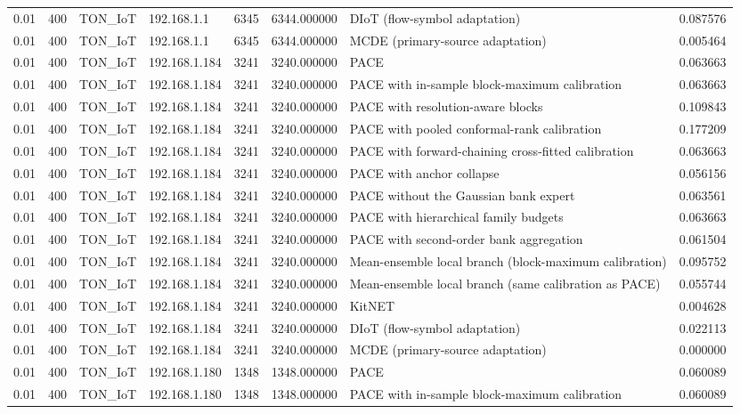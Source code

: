 \begin{tabular}{llllllll}
0.01 & 400 & TON\_IoT & 192.168.1.1 & 6345 & 6344.000000 & DIoT (flow-symbol adaptation) & 0.087576 \\
0.01 & 400 & TON\_IoT & 192.168.1.1 & 6345 & 6344.000000 & MCDE (primary-source adaptation) & 0.005464 \\
0.01 & 400 & TON\_IoT & 192.168.1.184 & 3241 & 3240.000000 & PACE & 0.063663 \\
0.01 & 400 & TON\_IoT & 192.168.1.184 & 3241 & 3240.000000 & PACE with in-sample block-maximum calibration & 0.063663 \\
0.01 & 400 & TON\_IoT & 192.168.1.184 & 3241 & 3240.000000 & PACE with resolution-aware blocks & 0.109843 \\
0.01 & 400 & TON\_IoT & 192.168.1.184 & 3241 & 3240.000000 & PACE with pooled conformal-rank calibration & 0.177209 \\
0.01 & 400 & TON\_IoT & 192.168.1.184 & 3241 & 3240.000000 & PACE with forward-chaining cross-fitted calibration & 0.063663 \\
0.01 & 400 & TON\_IoT & 192.168.1.184 & 3241 & 3240.000000 & PACE with anchor collapse & 0.056156 \\
0.01 & 400 & TON\_IoT & 192.168.1.184 & 3241 & 3240.000000 & PACE without the Gaussian bank expert & 0.063561 \\
0.01 & 400 & TON\_IoT & 192.168.1.184 & 3241 & 3240.000000 & PACE with hierarchical family budgets & 0.063663 \\
0.01 & 400 & TON\_IoT & 192.168.1.184 & 3241 & 3240.000000 & PACE with second-order bank aggregation & 0.061504 \\
0.01 & 400 & TON\_IoT & 192.168.1.184 & 3241 & 3240.000000 & Mean-ensemble local branch (block-maximum calibration) & 0.095752 \\
0.01 & 400 & TON\_IoT & 192.168.1.184 & 3241 & 3240.000000 & Mean-ensemble local branch (same calibration as PACE) & 0.055744 \\
0.01 & 400 & TON\_IoT & 192.168.1.184 & 3241 & 3240.000000 & KitNET & 0.004628 \\
0.01 & 400 & TON\_IoT & 192.168.1.184 & 3241 & 3240.000000 & DIoT (flow-symbol adaptation) & 0.022113 \\
0.01 & 400 & TON\_IoT & 192.168.1.184 & 3241 & 3240.000000 & MCDE (primary-source adaptation) & 0.000000 \\
0.01 & 400 & TON\_IoT & 192.168.1.180 & 1348 & 1348.000000 & PACE & 0.060089 \\
0.01 & 400 & TON\_IoT & 192.168.1.180 & 1348 & 1348.000000 & PACE with in-sample block-maximum calibration & 0.060089 \\

\end{tabular}
